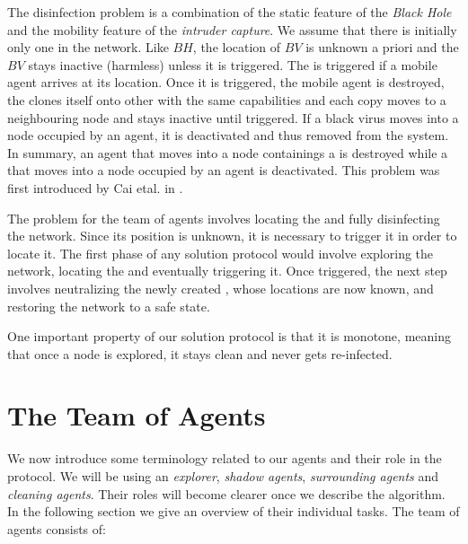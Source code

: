  
 The \bv disinfection problem is a combination of the static feature of the {\it Black Hole} and the mobility feature of the {\it intruder capture}. We assume that there is initially only one \bv in the network. Like $BH$, the location of $BV$ is unknown a priori and the $BV$  stays inactive (harmless) unless it is triggered.  
The \bv is triggered if a mobile agent arrives at its location. Once it is triggered, the mobile agent is destroyed, the \bv clones itself onto other \bvs with the same capabilities and each copy moves to a neighbouring node and stays inactive  until triggered. If a black virus moves into a node occupied by an agent, it is deactivated and thus removed from the system. In summary, an agent that moves into a node containings a  \bv is destroyed while a
  \bv that moves into a node occupied by an agent is deactivated. This problem was first introduced by Cai etal. in \cite{caietal18}.

The problem for the team of agents involves locating the \bv and fully disinfecting the network. Since its position is unknown, it is necessary to trigger it in order to locate it. The first phase of any solution protocol would involve exploring the network, locating the \bv and eventually triggering it. 
Once triggered, the next step involves neutralizing the newly created \bvs, whose locations are now known,  
and  restoring the network to a safe state.
 
One important property of our solution protocol is that it is monotone, meaning that once a node is explored, it stays clean and never gets re-infected.
 




\section{The Team of Agents} 


We now introduce some terminology related to our agents and their role in the protocol.
We will be using  an {\em explorer},    {\em shadow agents}, {\em surrounding agents}  and {\em cleaning agents}.  Their roles will become clearer once we describe the algorithm. In the following section we give an overview of their  individual tasks.
The team of agents consists of:

